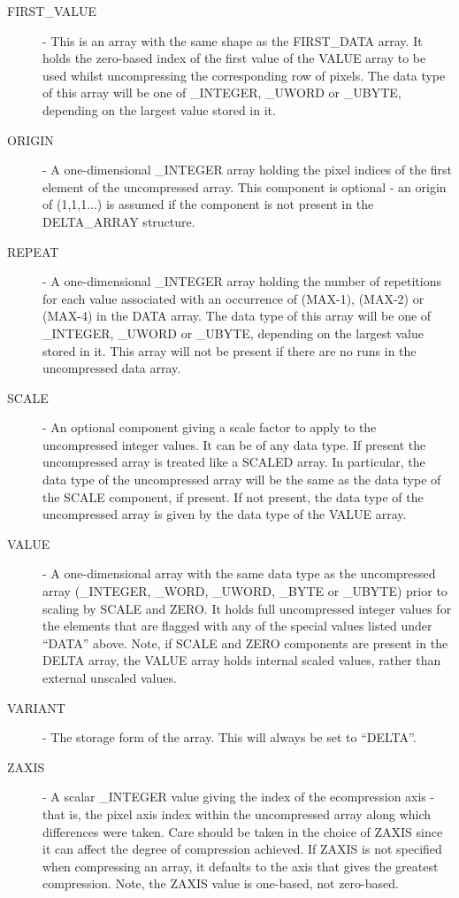 \documentclass[twoside,11pt]{article}
\begin{document}
\begin{description}
\item[FIRST\_VALUE] - This is an array with the same shape as
the FIRST\_DATA array. It holds the zero-based index of the first value
of the VALUE array to be used whilst uncompressing the corresponding
row of pixels. The data type of this array will be one of \_INTEGER,
\_UWORD or \_UBYTE, depending on the largest value stored in it.

\item[ORIGIN] - A one-dimensional \_INTEGER array holding the pixel indices
of the first element of the uncompressed array. This component is optional
- an origin of (1,1,1...) is assumed if the component is not present in the
DELTA\_ARRAY structure.

\item[REPEAT] - A one-dimensional \_INTEGER array holding the number of
repetitions for each value associated with an occurrence of (MAX-1),
(MAX-2) or (MAX-4) in the DATA array. The data type of this array will be
one of \_INTEGER, \_UWORD or \_UBYTE, depending on the largest value stored in
it. This array will not be present if there are no runs in the uncompressed
data array.

\item[SCALE] - An optional component giving a scale factor to apply to the
uncompressed integer values. It can be of any data type. If present the
uncompressed array is treated like a SCALED array. In particular, the
data type of the uncompressed array will be the same as the data type of
the SCALE component, if present. If not present, the data type of the
uncompressed array is given by the data type of the VALUE array.

\item[VALUE] - A one-dimensional array with the same data type as the
uncompressed array (\_INTEGER, \_WORD, \_UWORD, \_BYTE or \_UBYTE) prior to
scaling by SCALE and ZERO. It holds full uncompressed integer values for
the elements that are flagged with any of the special values listed under
``DATA'' above. Note, if SCALE and ZERO components are present in the
DELTA array, the VALUE array holds internal scaled values, rather than
external unscaled values.

\item[VARIANT] - The storage form of the array. This will always be set to
``DELTA''.

\item[ZAXIS] - A scalar \_INTEGER value giving the index of the ecompression
axis - that is, the pixel axis index within the uncompressed array along
which differences were taken. Care should be taken in the choice of ZAXIS
since it can affect the degree of compression achieved. If ZAXIS is not
specified when compressing an array, it defaults to the axis that gives the
greatest compression. Note, the ZAXIS value is one-based, not zero-based.


\end{description}
\end{document}
